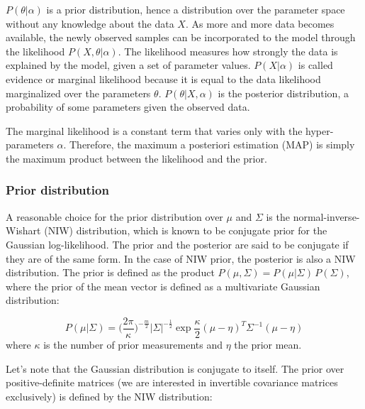             $P(\theta \vert \alpha)$ is a prior distribution, hence a distribution over the parameter space without
            any knowledge about the data $X$. As more and more data becomes available, the newly observed samples can be
            incorporated to the model through the likelihood $P(X, \theta \vert \alpha)$. The likelihood measures how strongly
            the data is explained by the model, given a set of parameter values. $P(X \vert \alpha)$ is called evidence or
            marginal likelihood because it is equal to the data likelihood marginalized over the parameters $\theta$.
            $P(\theta \vert X, \alpha)$ is the posterior distribution, a probability of some parameters given
            the observed data.

            The marginal likelihood is a constant term that varies only with the hyper-parameters $\alpha$. Therefore, the maximum
            a posteriori estimation (MAP) is simply the maximum product between the likelihood and the prior.

        \subsubsection{Prior distribution}

            A reasonable choice for the prior distribution over $\mu$ and $\Sigma$ is the normal-inverse-Wishart (NIW)
            distribution, which is known to be conjugate prior for the Gaussian log-likelihood.
            The prior and the posterior are said to be conjugate if they are of the same form. In the case of NIW prior,
            the posterior is also a NIW distribution. The prior is defined as the product
            $P(\mu, \Sigma) = P(\mu \vert \Sigma)\,P(\Sigma)$, where the prior of the mean vector is defined as a multivariate
            Gaussian distribution:

            \begin{equation}
                P(\mu \vert \Sigma) = \Big(\frac{2 \pi}{\kappa}\Big)^{-\frac{m}{2}} \vert\Sigma\vert^{-\frac{1}{2}}
                \exp{\frac{\kappa}{2} (\mu - \eta)^T \Sigma^{-1} (\mu - \eta)}
            \end{equation}
            where $\kappa$ is the number of prior measurements and $\eta$ the prior mean.

            Let's note that the Gaussian distribution is conjugate to itself. The prior over positive-definite matrices
            (we are interested in invertible covariance matrices exclusively) is defined by the NIW distribution:


